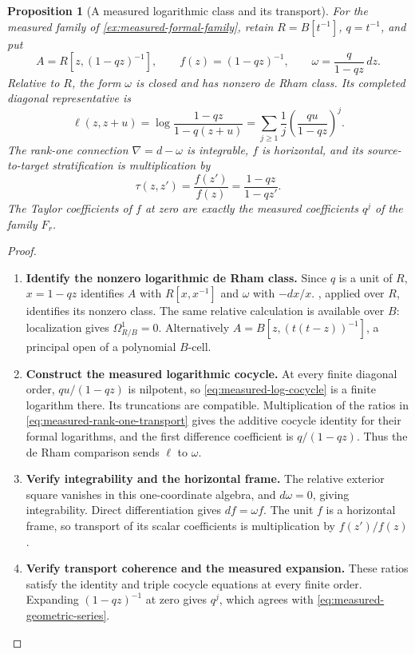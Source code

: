 \documentclass[11pt,a4paper]{article}
\numberwithin{algorithm}{section}
\numberwithin{equation}{section}
\newtheorem{proposition}[proposition]{Proposition}
\theoremstyle{definition}
\theoremstyle{remark}
\theoremstyle{plain}
\theoremstyle{definition}
\theoremstyle{plain}
\begin{document}
\begin{proposition}[A measured logarithmic class and its transport]
\label{prop:measured-logarithmic-transport}
For the measured family of \cref{ex:measured-formal-family}, retain
$R=B[t^{-1}]$, $q=t^{-1}$, and put
\[
 A=R[z,(1-qz)^{-1}],\qquad f(z)=(1-qz)^{-1},\qquad
 \omega=\frac{q}{1-qz}\,dz.
\]
Relative to $R$, the form $\omega$ is closed and has nonzero de Rham
class. Its completed diagonal representative is
\begin{equation}\label{eq:measured-log-cocycle}
 \ell(z,z+u)
 =\log\frac{1-qz}{1-q(z+u)}
 =\sum_{j\ge1}\frac1j\left(\frac{qu}{1-qz}\right)^j.
\end{equation}
The rank-one connection $\nabla=d-\omega$ is integrable, $f$ is
horizontal, and its source-to-target stratification is multiplication by
\begin{equation}\label{eq:measured-rank-one-transport}
 \tau(z,z')=\frac{f(z')}{f(z)}=\frac{1-qz}{1-qz'}.
\end{equation}
The Taylor coefficients of $f$ at zero are exactly the measured
coefficients $q^j$ of the family $F_r$.
\end{proposition}
\begin{proof}\leavevmode
\begin{enumerate}[leftmargin=*,align=left]
\item \textbf{Identify the nonzero logarithmic de Rham class.}
Since $q$ is a unit of $R$, $x=1-qz$ identifies $A$ with
$R[x,x^{-1}]$ and $\omega$ with $-dx/x$.
, applied over $R$, identifies its
nonzero class. The same relative calculation is available over $B$:
localization gives $\Omega^1_{R/B}=0$. Alternatively
$A=B[z,(t(t-z))^{-1}]$, a principal open of a polynomial $B$-cell.

\item \textbf{Construct the measured logarithmic cocycle.}
At every finite diagonal order, $qu/(1-qz)$ is nilpotent, so
\eqref{eq:measured-log-cocycle} is a finite logarithm there. Its
truncations are compatible. Multiplication of the ratios in
\eqref{eq:measured-rank-one-transport} gives the additive cocycle
identity for their formal logarithms, and the first difference
coefficient is $q/(1-qz)$. Thus the de Rham comparison sends $\ell$
to $\omega$.

\item \textbf{Verify integrability and the horizontal frame.}
The relative exterior square vanishes in this one-coordinate algebra,
and $d\omega=0$, giving integrability. Direct differentiation gives
$df=\omega f$. The unit $f$ is a horizontal frame, so transport of
its scalar coefficients is multiplication by $f(z')/f(z)$.

\item \textbf{Verify transport coherence and the measured expansion.}
These ratios satisfy the identity and triple cocycle equations at
every finite order. Expanding $(1-qz)^{-1}$ at zero gives $q^j$,
which agrees with \eqref{eq:measured-geometric-series}.
\end{enumerate}
\end{proof}
\end{document}
